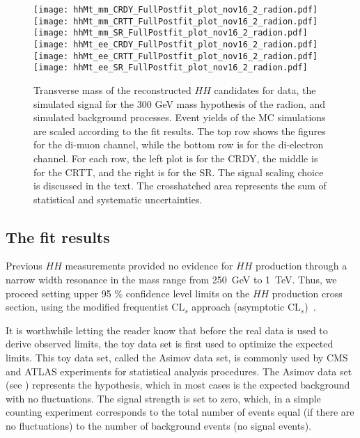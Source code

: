 \begin{figure}[H]
\begin{center}
\texttt{[image: hhMt\_mm\_CRDY\_FullPostfit\_plot\_nov16\_2\_radion.pdf]}
\texttt{[image: hhMt\_mm\_CRTT\_FullPostfit\_plot\_nov16\_2\_radion.pdf]}
\texttt{[image: hhMt\_mm\_SR\_FullPostfit\_plot\_nov16\_2\_radion.pdf]} \\
\texttt{[image: hhMt\_ee\_CRDY\_FullPostfit\_plot\_nov16\_2\_radion.pdf]}
\texttt{[image: hhMt\_ee\_CRTT\_FullPostfit\_plot\_nov16\_2\_radion.pdf]}
\texttt{[image: hhMt\_ee\_SR\_FullPostfit\_plot\_nov16\_2\_radion.pdf]}
\caption[Transverse mass of the reconstructed $HH$ candidates for graviton hypothesis.]{Transverse mass of the reconstructed $HH$ candidates for data, the simulated signal for the 300 GeV mass hypothesis of the radion, and simulated background processes. Event yields of the MC simulations are scaled according to the fit results. The top row shows the figures for the di-muon channel, while the bottom row is for the di-electron channel. For each row, the left plot is for the CRDY, the middle is for the CRTT, and the right is for the SR. The signal scaling choice is discussed in the text. The crosshatched area represents the sum of statistical and systematic uncertainties.}
\label{MCcomparisons_radion} 
\end{center}
\end{figure}

\subsection{The fit results}
\label{sec:fit_results}

Previous $HH$ measurements provided no evidence for $HH$ production through a narrow width resonance in the mass range from 250~GeV to 1~TeV. Thus, we proceed setting upper 95 \% confidence level limits on the $HH$ production cross section, using the modified frequentist CL$_s$ approach (asymptotic CL$_s$)~\cite{Junk:1999kv,LEP-CLs, HIG-11-011, Cowan:2010js}.

It is worthwhile letting the reader know that before the real data is used to derive observed limits, the toy data set is first used to optimize the expected limits. This toy data set, called the Asimov data set, is commonly used by CMS and ATLAS experiments for statistical analysis procedures. The Asimov data set (see \cite{Cowan:2010js}) represents the hypothesis, which in most cases is the expected background with no fluctuations. The signal strength is set to zero, which, in a simple counting experiment \cite{expected_limit_asimov} corresponds to the total number of events equal (if there are no fluctuations) to the number of background events (no signal events). 

